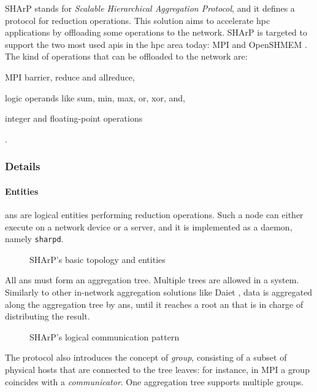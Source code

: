 SHArP \cite{sharp} stands for \textit{Scalable Hierarchical Aggregation Protocol}, and it defines a protocol for reduction operations.
This solution aims to accelerate \gls{hpc} applications by offloading some operations to the network. SHArP \cite{sharp} is targeted to support the two most used \glspl{api} in the \gls{hpc} area today: MPI \cite{mpi} and OpenSHMEM \cite{openshmem}.
The kind of operations that can be offloaded to the network are:
\begin{mylist}
    \item MPI \cite{mpi} barrier, reduce and allreduce,
    \item logic operands like sum, min, max, or, xor, and,
    \item integer and floating-point operations
\end{mylist}.

\subsubsection{Details}
\paragraph{Entities}
\glspl{an} are logical entities performing reduction operations.
Such a node can either execute on a network device or a server, and it is implemented as a daemon, namely \texttt{sharpd}.

\begin{figure}[!htb]
    \centering
    \usebox{\sharpbasic}
    \caption{SHArP's \texorpdfstring{\cite{sharp}}{} basic topology and entities}
\end{figure}

All \glspl{an} must form an aggregation tree.
Multiple trees are allowed in a system.
Similarly to other in-network aggregation solutions like Daiet \cite{daiet}, data is aggregated along the aggregation tree by \glspl{an}, until it reaches a root \gls{an} that is in charge of distributing the result.

\begin{figure}[!htb]
    \centering
    \usebox{\sharpcommunication}
    \caption{SHArP's \texorpdfstring{\cite{sharp}}{} logical communication pattern}
\end{figure}

The protocol also introduces the concept of \textit{group}, consisting of a subset of physical hosts that are connected to the tree leaves: for instance, in MPI \cite{mpi} a group coincides with a \textit{communicator}.
One aggregation tree supports multiple groups.

